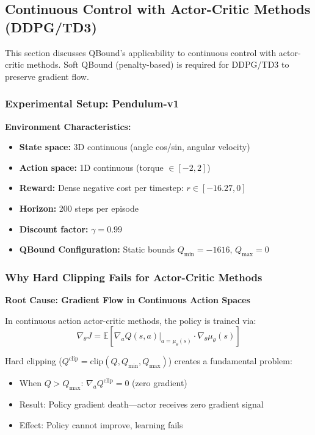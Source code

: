 \documentclass[11pt]{article}
\theoremstyle{definition}
\theoremstyle{remark}
\begin{document}
\subsection{Continuous Control with Actor-Critic Methods (DDPG/TD3)}
\label{sec:pendulum_ddpg}

This section discusses QBound's applicability to continuous control with actor-critic methods. Soft QBound (penalty-based) is required for DDPG/TD3 to preserve gradient flow.

\subsubsection{Experimental Setup: Pendulum-v1}

\textbf{Environment Characteristics:}
\begin{itemize}
    \item \textbf{State space:} 3D continuous (angle cos/sin, angular velocity)
    \item \textbf{Action space:} 1D continuous (torque $\in [-2, 2]$)
    \item \textbf{Reward:} Dense negative cost per timestep: $r \in [-16.27, 0]$
    \item \textbf{Horizon:} 200 steps per episode
    \item \textbf{Discount factor:} $\gamma = 0.99$
    \item \textbf{QBound Configuration:} Static bounds $Q_{\min} = -1616$, $Q_{\max} = 0$
\end{itemize}

\subsubsection{Why Hard Clipping Fails for Actor-Critic Methods}

\textbf{Root Cause: Gradient Flow in Continuous Action Spaces}

In continuous action actor-critic methods, the policy is trained via:
$$\nabla_\theta J = \mathbb{E}[\nabla_a Q(s,a)|_{a=\mu_\theta(s)} \cdot \nabla_\theta \mu_\theta(s)]$$

Hard clipping ($Q^{\text{clip}} = \text{clip}(Q, Q_{\min}, Q_{\max})$) creates a fundamental problem:
\begin{itemize}
    \item When $Q > Q_{\max}$: $\nabla_a Q^{\text{clip}} = 0$ (zero gradient)
    \item Result: Policy gradient death—actor receives zero gradient signal
    \item Effect: Policy cannot improve, learning fails
\end{itemize}
\end{document}
